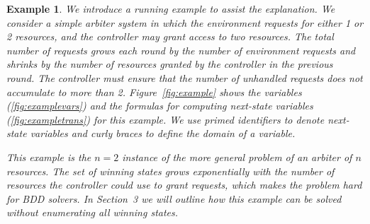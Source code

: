 \documentclass{llncs}
\newtheorem*{exmp}{Example}
\begin{document}
\begin{exmp}
We introduce a running example to assist the explanation. We consider a
simple arbiter system in which the environment requests for either 1 or 2
resources, and the controller may grant access to two resources. The total
number of requests grows each round by the number of environment requests and
shrinks by the number of resources granted by the controller in the previous
round.  The controller must ensure that the number of unhandled requests does
not accumulate to more than 2.  Figure~\ref{fig:example} shows the variables
(\ref{fig:examplevars}) and the formulas for computing next-state variables
(\ref{fig:exampletrans}) for this example. We use primed identifiers to denote
next-state variables and curly braces to define the domain of a variable.

This example is the $n=2$ instance of the more general problem of an arbiter of
$n$ resources. The set of winning states grows exponentially with the number of
resources the controller could use to grant requests, which makes the problem
hard for BDD solvers. In Section~3 we will outline how this example can be
solved without enumerating all winning states.

\end{exmp}
\end{document}
